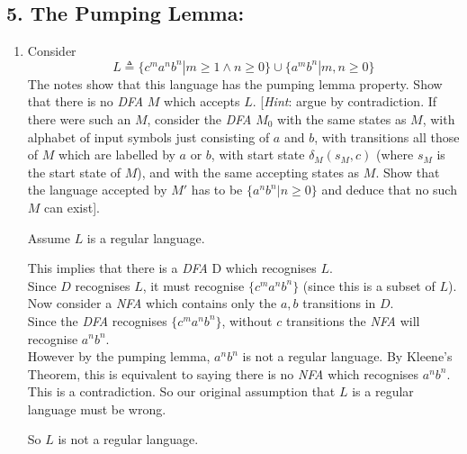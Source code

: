 \documentclass[10pt,\jkfside,a4paper]{article}
\newcommand{\dfa}{\textit{DFA} }
\newcommand{\nfa}{\textit{NFA} }
\begin{document}
\subsection*{5. The Pumping Lemma:}

\begin{enumerate}

\item Consider
\[
L \triangleq \{c^ma^nb^n | m \geq 1 \wedge n \geq 0\} \cup \{a^mb^n | m, n \geq 0\}
\]
The notes show that this language has the pumping lemma property. Show that there is no
\dfa $M$ which accepts $L$. [\textit{Hint}: argue by contradiction. If there were such an $M$, consider
the \dfa $M_0$ with the same states as $M$, with alphabet of input symbols just consisting of $a$
and $b$, with transitions all those of $M$ which are labelled by $a$ or $b$, with start state 
$\delta_M(s_M, c)$ (where $s_M$ is the start state of $M$), and with the same accepting states as $M$. Show 
that the language accepted by $M'$ has to be $\{a^nb^n| n \geq 0\}$ and deduce that no such 
$M$ can exist].

Assume $L$ is a regular language.

This implies that there is a \dfa D which recognises $L$. \\
Since $D$ recognises $L$, it must recognise $\{c^ma^nb^n\}$ (since this is a subset of $L$). \\
Now consider a \nfa which contains only the $a, b$ transitions in $D$. \\
Since the \dfa recognises $\{c^ma^nb^n\}$, without $c$ transitions the \nfa will recognise $a^nb^n$. \\
However by the pumping lemma, $a^nb^n$ is not a regular language. By Kleene’s Theorem, this is 
equivalent to saying there is no \nfa which recognises $a^nb^n$. \\
This is a contradiction. So our original assumption that $L$ is a regular language must be wrong. 

So $L$ is not a regular language.

\end{enumerate}
\end{document}
